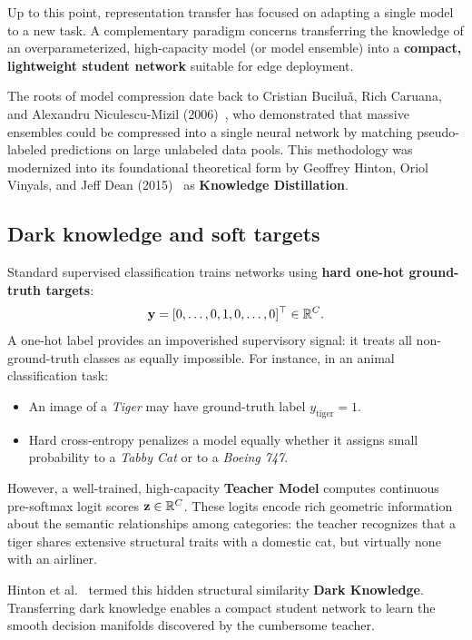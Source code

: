 Up to this point, representation transfer has focused on adapting a single model to a new task. A complementary paradigm concerns transferring the knowledge of an overparameterized, high-capacity model (or model ensemble) into a \textbf{compact, lightweight student network} suitable for edge deployment.

The roots of model compression date back to Cristian Bucilu\v{a}, Rich Caruana, and Alexandru Niculescu-Mizil (2006)~\cite{bucilua2006model}, who demonstrated that massive ensembles could be compressed into a single neural network by matching pseudo-labeled predictions on large unlabeled data pools. This methodology was modernized into its foundational theoretical form by Geoffrey Hinton, Oriol Vinyals, and Jeff Dean (2015)~\cite{hinton2015distilling} as \textbf{Knowledge Distillation}.

\subsection{Dark knowledge and soft targets}
\label{sec:dark_knowledge_concept}

Standard supervised classification trains networks using \textbf{hard one-hot ground-truth targets}:
\begin{equation}
\mathbf{y} = [0, \dots, 0, 1, 0, \dots, 0]^\top \in \mathbb{R}^C.
\end{equation}
A one-hot label provides an impoverished supervisory signal: it treats all non-ground-truth classes as equally impossible. For instance, in an animal classification task:
\begin{itemize}[noitemsep,topsep=2pt,parsep=0pt,partopsep=0pt]
  \item An image of a \textit{Tiger} may have ground-truth label $y_{\text{tiger}} = 1$.
  \item Hard cross-entropy penalizes a model equally whether it assigns small probability to a \textit{Tabby Cat} or to a \textit{Boeing 747}.
\end{itemize}

However, a well-trained, high-capacity \textbf{Teacher Model} computes continuous pre-softmax logit scores $\mathbf{z} \in \mathbb{R}^C$. These logits encode rich geometric information about the semantic relationships among categories: the teacher recognizes that a tiger shares extensive structural traits with a domestic cat, but virtually none with an airliner. 

Hinton et al.~\cite{hinton2015distilling} termed this hidden structural similarity \textbf{Dark Knowledge}. Transferring dark knowledge enables a compact student network to learn the smooth decision manifolds discovered by the cumbersome teacher.

